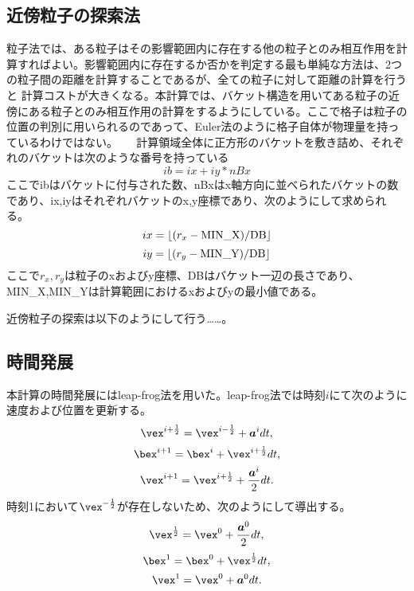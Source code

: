\documentclass[]{jsarticle}
\begin{document}
\subsection{近傍粒子の探索法}
粒子法では、ある粒子はその影響範囲内に存在する他の粒子とのみ相互作用を計算すればよい。影響範囲内に存在するか否かを判定する最も単純な方法は、2つの粒子間の距離を計算することであるが、全ての粒子に対して距離の計算を行うと
計算コストが大きくなる。本計算では、バケット構造を用いてある粒子の近傍にある粒子とのみ相互作用の計算をするようにしている。\cite{Koshiduka2014}ここで格子は粒子の位置の判別に用いられるのであって、Euler法のように格子自体が物理量を持っているわけではない。
　
計算領域全体に正方形のバケットを敷き詰め、それぞれのバケットは次のような番号を持っている
\begin{equation}
ib=ix+iy*nBx
\end{equation}
ここでibはバケットに付与された数、nBxはx軸方向に並べられたバケットの数であり、ix,iyはそれぞれバケットのx,y座標であり、次のようにして求められる。
\begin{equation}
ix=\lfloor(r_x-\rm{MIN\_X})/DB \rfloor
\end{equation}
\begin{equation}
iy=\lfloor(r_y-\rm{MIN\_Y})/DB \rfloor
\end{equation}
ここで$r_x,r_y$は粒子のxおよびy座標、DBはバケット一辺の長さであり、MIN\_X,MIN\_Yは計算範囲におけるxおよびyの最小値である。

近傍粒子の探索は以下のようにして行う……。


\subsection{時間発展}
本計算の時間発展にはleap-frog法を用いた。leap-frog法では時刻$i$にて次のように速度および位置を更新する。
\begin{equation}
  \vex^{i+\frac{1}{2}}=\vex^{i-\frac{1}{2}}+\bm{a}^idt,
\end{equation}
\begin{equation}
  \bex^{i+1}=\bex^i+\vex^{i+\frac{1}{2}}dt,
\end{equation}
\begin{equation}
  \vex^{i+1}=\vex^{i+\frac{1}{2}}+\frac{\bm{a}^i}{2}dt.
\end{equation}
時刻1において$\vex^{-\frac{1}{2}}$が存在しないため、次のようにして導出する。
\begin{equation}
  \vex^{\frac{1}{2}}=\vex^{0}+\frac{\bm{a}^0}{2}dt,
\end{equation}
\begin{equation}
  \bex^{1}=\bex^0+\vex^{\frac{1}{2}}dt,
\end{equation}
\begin{equation}
  \vex^{1}=\vex^{0}+\bm{a}^0dt.
\end{equation}
\end{document}
